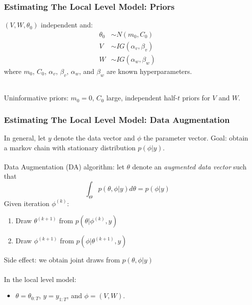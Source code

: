 \documentclass[xcolor=dvipsnames]{beamer}
\begin{document}
\begin{frame}
  \frametitle{Estimating The Local Level Model: Priors}
$(V,W,\theta_0)$ independent and:
\begin{align*}
  \theta_0 &\sim N(m_0, C_0)\\
  V &\sim IG(\alpha_v, \beta_v)\\
  W &\sim IG(\alpha_w, \beta_w)
\end{align*}
where $m_0$, $C_0$, $\alpha_v$, $\beta_v$, $\alpha_w$, and $\beta_w$ are known hyperparameters.\\~\\\pause

Uninformative priors: $m_0=0$, $C_0$ large, independent half-$t$ priors for $V$ and $W$.
\end{frame}

\begin{frame}
  \frametitle{Estimating The Local Level Model: Data Augmentation}
In general, let $y$ denote the data vector and $\phi$ the parameter vector. Goal: obtain a markov chain with stationary distribution $p(\phi|y)$.\\~\\

Data Augmentation (DA) algorithm: let $\theta$ denote an {\it \color{red} augmented data vector} such that 
\[
\int_\Theta p(\theta,\phi|y)d\theta = p(\phi|y)
\] 
Given iteration $\phi^{(k)}$:
\begin{enumerate}
  \item Draw $\theta^{(k+1)}$ from $p(\theta|\phi^{(k)}, y)$\\
  \item Draw $\phi^{(k+1)}$ from $p(\phi|\theta^{(k+1)}, y)$\\
\end{enumerate}
\pause
Side effect: we obtain joint draws from $p(\theta,\phi|y)$\\~\\

In the local level model:
\begin{itemize}
\item[] $\theta=\theta_{0:T}$, $y=y_{1:T}$, and $\phi=(V,W)$.
\end{itemize}
\end{frame}
\end{document}
